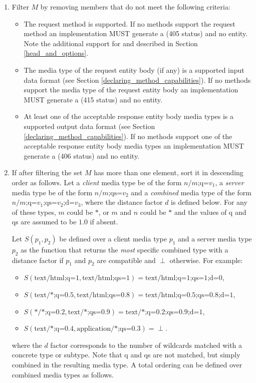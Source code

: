 \begin{enumerate}
\begin{enumerate}
\item \label{filter_methods} Filter $M$ by removing members that do not meet the following criteria:
\begin{itemize}
\item The request method is supported. If no methods support the request method an implementation MUST generate a  (405 status) and no entity. Note the additional support for  and  described in Section \ref{head_and_options}.
\item The media type of the request entity body (if any) is a supported input data format (see Section \ref{declaring_method_capabilities}). If no methods support the media type of the request entity body an implementation MUST generate a  (415 status) and no entity.
\item At least one of the acceptable response entity body media types is a supported output data format (see Section \ref{declaring_method_capabilities}). If no methods support one of the acceptable response entity body media types an implementation MUST generate a  (406 status) and no entity.
\end{itemize} 

\newcommand{\bottom}{\perp}

\item If after filtering the set $M$ has more than one element, sort it in descending order as follows. Let a {\em client} media type be of the form $\mbox{$n$/$m$;q=$v_1$}$, a {\em server} media type be of the form $\mbox{$n$/$m$;qs=$v_2$}$ and a {\em combined} media type of the form $\mbox{$n$/$m$;q=$v_1$;qs=$v_2$;d=$v_3$}$, where the distance factor $d$ is defined below. For any of these types, $m$ could be $*$, or $m$ and $n$ could be $*$ and the values of q and qs are assumed to be $1.0$ if absent. 

Let $S(p_1, p_2)$ be defined over a client media type $p_1$ and a server media type $p_2$ as the function that returns the {\em most} specific combined type with a distance factor if $p_1$ and $p_2$ are compatible and $\bottom$ otherwise. For example: 
\begin{itemize}
\item $S(\mbox{text/html;q=1}, \mbox{text/html;qs=1}) = \mbox{text/html;q=1;qs=1;d=0}$,
\item $S(\mbox{text/*;q=0.5}, \mbox{text/html;qs=0.8}) = \mbox{text/html;q=0.5;qs=0.8;d=1}$,
\item $S(\mbox{*/*;q=0.2}, \mbox{text/*;qs=0.9}) = \mbox{text/*;q=0.2;qs=0.9;d=1}$,
\item $S(\mbox{text/*;q=0.4}, \mbox{application/*;qs=0.3}) = \bottom$.
\end{itemize}
where the $d$ factor corresponds to the number of wildcards matched with a concrete type or subtype.
Note that q and qs are not matched, but simply combined in the resulting media type. A total ordering can be defined over combined media types as follows. 


\end{enumerate}
\end{enumerate}
